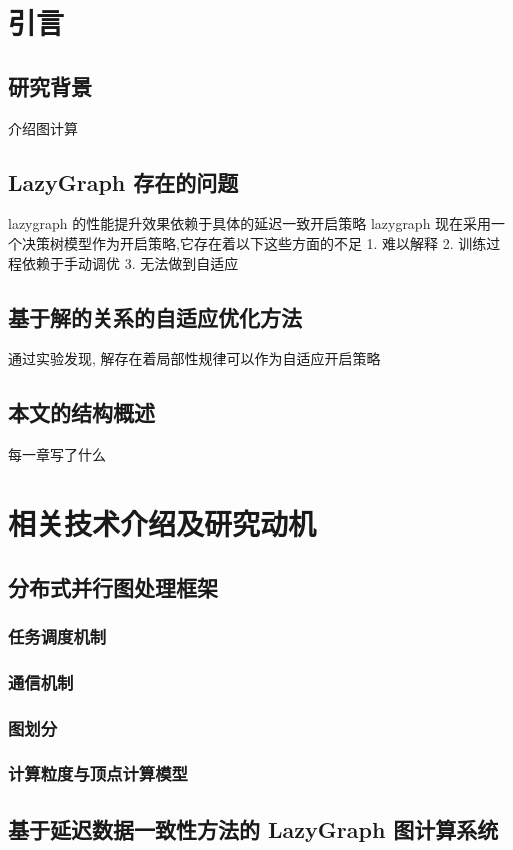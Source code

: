 \documentclass[twoside]{Style/ucasthesis}%
\begin{document}
\mainmatter%
\chapter{引言}
\section{研究背景}
介绍图计算
\section{LazyGraph 存在的问题}
lazygraph 的性能提升效果依赖于具体的延迟一致开启策略
lazygraph 现在采用一个决策树模型作为开启策略,它存在着以下这些方面的不足
1. 难以解释
2. 训练过程依赖于手动调优
3. 无法做到自适应
\section{基于解的关系的自适应优化方法}
通过实验发现, 解存在着局部性规律可以作为自适应开启策略
\section{本文的结构概述}
每一章写了什么

\chapter{相关技术介绍及研究动机}
\section{分布式并行图处理框架}
\subsection{任务调度机制}
\subsection{通信机制}
\subsection{图划分}
\subsection{计算粒度与顶点计算模型}

\section{基于延迟数据一致性方法的 LazyGraph 图计算系统}
\end{document}
